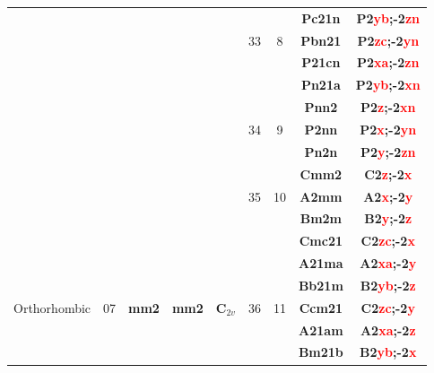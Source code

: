 \documentclass{article}      %
\begin{document}
\begin{small}
\begin{longtable}[c]{|c|c|c|c|c|c|c|c|c|}
          &  & & & &  & &\textbf{Pc21n}       &\textbf{P2\textcolor{red}{yb};-2\textcolor{red}{zn}}\\\cline{8-9}         
	  &  & & & &\textrm{33}  &\textrm{8} &\textbf{Pbn21}       &\textbf{P2\textcolor{red}{zc};-2\textcolor{red}{yn}}\\\cline{8-9}         
          &  & & & &  & &\textbf{P21cn}       &\textbf{P2\textcolor{red}{xa};-2\textcolor{red}{zn}}\\\cline{8-9}         
          &  & & & &  & &\textbf{Pn21a}       &\textbf{P2\textcolor{red}{yb};-2\textcolor{red}{xn}}\\\cline{6-9}         
          &  & & & &  & &\textbf{Pnn2}         &\textbf{P2\textcolor{red}{z};-2\textcolor{red}{xn}}\\\cline{8-9}          
	  &  & & & &\textrm{34}  &\textrm{9} &\textbf{P2nn}         &\textbf{P2\textcolor{red}{x};-2\textcolor{red}{yn}}\\\cline{8-9}          
          &  & & & &  & &\textbf{Pn2n}         &\textbf{P2\textcolor{red}{y};-2\textcolor{red}{zn}}\\\cline{6-9}          
          &  & & & &  & &\textbf{Cmm2}         &\textbf{C2\textcolor{red}{z};-2\textcolor{red}{x}}\\\cline{8-9}           
	  &  & & & &\textrm{35}  &\textrm{10} &\textbf{A2mm}         &\textbf{A2\textcolor{red}{x};-2\textcolor{red}{y}}\\\cline{8-9}           
          &  & & & &  & &\textbf{Bm2m}         &\textbf{B2\textcolor{red}{y};-2\textcolor{red}{z}}\\\cline{6-9}           
          &  & & & &  & &\textbf{Cmc21}       &\textbf{C2\textcolor{red}{zc};-2\textcolor{red}{x}}\\\cline{8-9}          
	  &  & & & &  & &\textbf{A21ma}       &\textbf{A2\textcolor{red}{xa};-2\textcolor{red}{y}}\\\cline{8-9}          
          &  & & & &  & &\textbf{Bb21m}       &\textbf{B2\textcolor{red}{yb};-2\textcolor{red}{z}}\\\cline{8-9}          
\textrm{Orthorhombic}   & \textrm{07} &\textbf{mm2} &\textbf{mm2} &$\mathbf{C}_{2v}$ &36  &\textrm{11} &\textbf{Ccm21}       &\textbf{C2\textcolor{red}{zc};-2\textcolor{red}{y}}\\\cline{8-9}          
          &  & & & &  & &\textbf{A21am}       &\textbf{A2\textcolor{red}{xa};-2\textcolor{red}{z}}\\\cline{8-9}          
          &  & & & &  & &\textbf{Bm21b}       &\textbf{B2\textcolor{red}{yb};-2\textcolor{red}{x}}\\\cline{6-9}          

\end{longtable}
\end{small}
\end{document}
